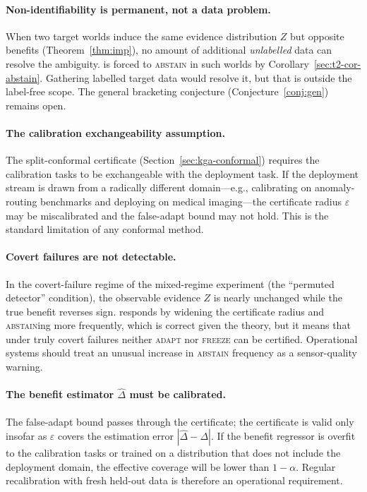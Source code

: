 \paragraph{Non-identifiability is permanent, not a data problem.}
When two target worlds induce the same evidence distribution $Z$ but opposite
benefits (Theorem~\ref{thm:imp}), no amount of additional \emph{unlabelled}
data can resolve the ambiguity.  \KGA{} is forced to \textsc{abstain} in such
worlds by Corollary~\ref{sec:t2-cor-abstain}.  Gathering labelled target data
would resolve it, but that is outside the label-free scope.  The general
bracketing conjecture (Conjecture~\ref{conj:gen}) remains open.

\paragraph{The calibration exchangeability assumption.}
The split-conformal certificate (Section~\ref{sec:kga-conformal}) requires the
calibration tasks to be exchangeable with the deployment task.  If the
deployment stream is drawn from a radically different domain---e.g., calibrating
on anomaly-routing benchmarks and deploying on medical imaging---the certificate
radius $\varepsilon$ may be miscalibrated and the false-adapt bound may not hold.
This is the standard limitation of any conformal method.

\paragraph{Covert failures are not detectable.}
In the covert-failure regime of the mixed-regime experiment (the ``permuted
detector'' condition), the observable evidence $Z$ is nearly unchanged while the
true benefit reverses sign.  \KGA{} responds by widening the certificate radius
and \textsc{abstain}ing more frequently, which is correct given the theory, but
it means that under truly covert failures neither \textsc{adapt} nor
\textsc{freeze} can be certified.  Operational systems should treat an unusual
increase in \textsc{abstain} frequency as a sensor-quality warning.

\paragraph{The benefit estimator $\widehat\Delta$ must be calibrated.}
The false-adapt bound passes through the certificate; the certificate is valid
only insofar as $\varepsilon$ covers the estimation error $|\widehat\Delta -
\Delta|$.  If the benefit regressor is overfit to the calibration tasks or
trained on a distribution that does not include the deployment domain, the
effective coverage will be lower than $1 - \alpha$.  Regular recalibration
with fresh held-out data is therefore an operational requirement.

